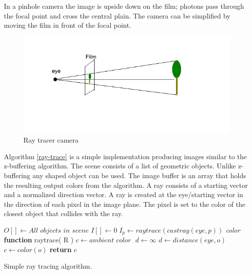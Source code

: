 \documentclass[11pt,a4paper,oneside]{article}
\begin{document}
In a pinhole camera the image is upside down on the film; photons pass through the focal point and cross the central plain.  The camera can be simplified by moving the film in front of the focal point.

 \begin{figure}[H]
 \begin{center}
\includegraphics[scale=0.6]{raycamera.png} 
\caption{Ray tracer camera}
\label{ray-camera}
\end{center}
\end{figure}

Algorithm \ref{ray-trace} is a simple implementation producing images similar to the z-buffering algorithm.  The scene consists of a list of geometric objects.  Unlike z-buffering any shaped object can be used.  The image buffer is an array that holds the resulting output colors from the algorithm.  A ray consists of a starting vector and a normalized direction vector.  A ray is created at the eye/starting vector in the direction of each pixel in the image plane.  The pixel is set to the color of the closest object that collides with the ray.  

\begin{algorithm}[H]
\begin{algorithmic}[1]
\STATE $O[ ] \gets \textit{All objects in scene}$ 
\STATE $I[] \gets 0$ 
\STATE
{}
	\STATE $I_{p} \gets raytrace( castray( eye, p ))$
\ENDFOR
\STATE 
\STATE \textit{color} \textbf{function} raytrace(  R )
	\STATE $c  \gets \textit{ambient color } $
	\STATE $d \gets \infty $
				\STATE $d \gets distance( \textit{eye}, o )$
				\STATE $c \gets color( o )$
			\ENDIF
		\ENDIF
	\ENDFOR
	\STATE \textbf{return} c

\end{algorithmic}
\caption{Simple ray tracing algorithm.}
\label{ray-trace}
\end{algorithm}
\end{document}
